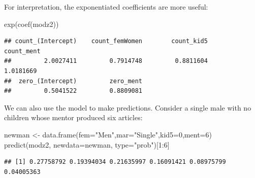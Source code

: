 \documentclass[
  ignorenonframetext,
]{beamer}
\newenvironment{Shaded}{\begin{snugshade}}{\end{snugshade}}
\newcommand{\AttributeTok}[1]{\textcolor[rgb]{0.77,0.63,0.00}{#1}}
\newcommand{\DecValTok}[1]{\textcolor[rgb]{0.00,0.00,0.81}{#1}}
\newcommand{\FunctionTok}[1]{\textcolor[rgb]{0.00,0.00,0.00}{#1}}
\newcommand{\NormalTok}[1]{#1}
\newcommand{\OtherTok}[1]{\textcolor[rgb]{0.56,0.35,0.01}{#1}}
\newcommand{\SpecialCharTok}[1]{\textcolor[rgb]{0.00,0.00,0.00}{#1}}
\newcommand{\StringTok}[1]{\textcolor[rgb]{0.31,0.60,0.02}{#1}}
\begin{document}
\begin{frame}[fragile]{}
\protect\hypertarget{section-45}{}
For interpretation, the exponentiated coefficients are more useful:

\vspace{12pt}
\tiny

\begin{Shaded}
\begin{Highlighting}[]
\FunctionTok{exp}\NormalTok{(}\FunctionTok{coef}\NormalTok{(modz2))}
\end{Highlighting}
\end{Shaded}

\begin{verbatim}
## count_(Intercept)    count_femWomen        count_kid5        count_ment 
##         2.0027411         0.7914748         0.8811604         1.0181669 
##  zero_(Intercept)         zero_ment 
##         0.5041522         0.8809081
\end{verbatim}

\vspace{12pt}
\normalsize

We can also use the model to make predictions. Consider a single male
with no children whose mentor produced six articles:

\vspace{12pt}
\tiny

\begin{Shaded}
\begin{Highlighting}[]
\NormalTok{newman }\OtherTok{\textless{}{-}} \FunctionTok{data.frame}\NormalTok{(}\AttributeTok{fem=}\StringTok{"Men"}\NormalTok{,}\AttributeTok{mar=}\StringTok{"Single"}\NormalTok{,}\AttributeTok{kid5=}\DecValTok{0}\NormalTok{,}\AttributeTok{ment=}\DecValTok{6}\NormalTok{)}
\FunctionTok{predict}\NormalTok{(modz2, }\AttributeTok{newdata=}\NormalTok{newman, }\AttributeTok{type=}\StringTok{"prob"}\NormalTok{)[}\DecValTok{1}\SpecialCharTok{:}\DecValTok{6}\NormalTok{]}
\end{Highlighting}
\end{Shaded}

\begin{verbatim}
## [1] 0.27758792 0.19394034 0.21635997 0.16091421 0.08975799 0.04005363
\end{verbatim}
\end{frame}
\end{document}
